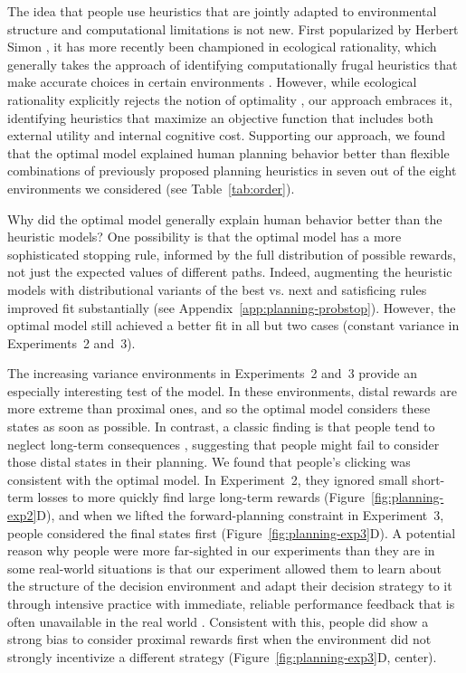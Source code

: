 The idea that people use heuristics that are jointly adapted to environmental structure and computational limitations is not new. First popularized by Herbert Simon \citep{simon1955behavioral}, it has more recently been championed in ecological rationality, which generally takes the approach of identifying computationally frugal heuristics that make accurate choices in certain environments \citep{gigerenzer2008why,gigerenzer2011heuristic,todd2003bounding,gigerenzer1996reasoning}. However, while ecological rationality explicitly rejects the notion of optimality \citep{gigerenzer1999simple}, our approach embraces it, identifying heuristics that maximize an objective function that includes both external utility and internal cognitive cost. Supporting our approach, we found that the optimal model explained human planning behavior better than flexible combinations of previously proposed planning heuristics in seven out of the eight environments we considered (see Table~\ref{tab:order}).

Why did the optimal model generally explain human behavior better than the heuristic models? One possibility is that the optimal model has a more sophisticated stopping rule, informed by the full distribution of possible rewards, not just the expected values of different paths. Indeed, augmenting the heuristic models with distributional variants of the best vs. next and satisficing rules improved fit substantially (see Appendix~\ref{app:planning-probstop}). However, the optimal model still achieved a better fit in all but two cases (constant variance in Experiments~2 and~3).

The increasing variance environments in Experiments~2 and~3 provide an especially interesting test of the model. In these environments, distal rewards are more extreme than proximal ones, and so the optimal model considers these states as soon as possible. In contrast, a classic finding is that people tend to neglect long-term consequences \citep{odonoghue1999doing}, suggesting that people might fail to consider those distal states in their planning. We found that people's clicking was consistent with the optimal model. In Experiment~2, they ignored small short-term losses to more quickly find large long-term rewards (Figure~\ref{fig:planning-exp2}D), and when we lifted the forward-planning constraint in Experiment~3, people considered the final states first (Figure~\ref{fig:planning-exp3}D). A potential reason why people were more far-sighted in our experiments than they are in some real-world situations is that our experiment allowed them to learn about the structure of the decision environment and adapt their decision strategy to it through intensive practice with immediate, reliable performance feedback that is often unavailable in the real world \citep{kahneman2009conditions}. Consistent with this, people did show a strong bias to consider proximal rewards first when the environment did not strongly incentivize a different strategy (Figure~\ref{fig:planning-exp3}D, center).

